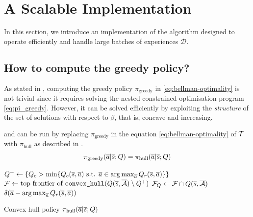 \documentclass{article}
\begin{document}



\section{A Scalable Implementation}
\label{sec:scalable-bftq}
In this section, we introduce an implementation of the \BFTQ algorithm designed to operate efficiently and handle large batches of experiences $\mathcal{D}$.

\subsection{How to compute the greedy policy?}
\label{subsec:compute-greedy-policy}
As stated in , computing the greedy policy $\pi_\text{greedy}$ in \eqref{eq:bellman-optimality} is not trivial since it requires solving the nested constrained optimisation program \eqref{eq:pi_greedy}. However, it can be solved efficiently by exploiting the \emph{structure} of the set of solutions with respect to $\beta$, that is, concave and increasing. 

\begin{proposition}
\label{prop:bftq_pi_hull}
 and  can be run by replacing $\pi_\text{greedy}$ in the equation \eqref{eq:bellman-optimality} of $\mathcal{T}$ with $\pi_\text{hull}$ as described in .
\begin{equation*}
    \pi_\text{greedy}(\overline{a}|\overline{s}; Q) = \pi_\text{hull}(\overline{a}|\overline{s}; Q)
\end{equation*}
\end{proposition}

\begin{algorithm}
\DontPrintSemicolon
{}
$Q^+\leftarrow \{Q_c > \min \{Q_c(\overline{s},\overline{a}) \text{ s.t. }\overline{a}\in\operatorname*{arg\,max}_{\overline{a}} Q_r(\overline{s},\overline{a})\} \}$\;
$\mathcal{F} \leftarrow \text{top frontier of }\texttt{convex\_hull}(Q(\overline{s},\overline{\mathcal{A}}) \setminus Q^+)$\;
$\mathcal{F}_Q \leftarrow \mathcal{F}\cap Q(\overline{s},\overline{\mathcal{A}})$\;
\Return $\delta(\overline{a} - \operatorname*{arg\,max}_{\overline{a}} Q_r(\overline{s},\overline{a}))$
\caption{Convex hull policy $\pi_\text{hull}(\overline{a}|\overline{s}; Q)$}
\label{algo:pi_hull}
\end{algorithm}
\end{document}
